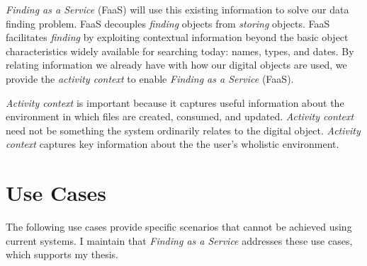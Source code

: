 \emph{Finding as a Service} (FaaS) will use this existing information to solve our data
finding problem. FaaS decouples \emph{finding} objects from \emph{storing}
objects.  FaaS facilitates \emph{finding} by exploiting contextual information
beyond the basic object characteristics widely available for searching today:
names, types, and dates. By relating information we already have with how our
digital objects are used, we provide the \emph{activity context} to enable
\emph{Finding as a Service} (FaaS).

\emph{Activity context} is important because it captures useful
information about the environment in which files are created,
consumed, and updated.  \emph{Activity context} need not be something the system
ordinarily relates to the digital object.  \emph{Activity context} captures key
information about the the user's wholistic environment.

\section{Use Cases}
\label{ch:intro:sec:use-cases}

The following use cases provide specific scenarios that cannot be
achieved using current systems.  I maintain that \emph{Finding as a Service}
addresses these use cases, which supports my thesis.

